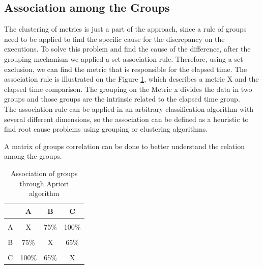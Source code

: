 \subsection{Association among the Groups}
\label{sec:association}
The clustering of metrics is just a part of the approach, since a rule of groups need to be applied to find the specific cause for the discrepancy on the executions. To solve this problem and find the cause of the difference, after the grouping mechanism we applied a set association rule. Therefore, using a set exclusion, we can find the metric that is responsible for the elapsed time.
The association rule is illustrated on the Figure \ref{fig:association}, which describes a metric X and the elapsed time comparison. The grouping on the Metric x divides the data in two groups and those groups are the intrinsic related to the elapsed time group. \\
The association rule can be applied in an arbitrary classification algorithm with several different dimensions, so the association can be defined as a heuristic to find root cause problems using grouping or clustering algorithms.

A matrix of groups correlation can be done to better understand the relation among the groups.


    
\begin{table}[h]
\centering
\begin{tabular}{cccc}
                      & A                         & B                        & C     \\ \hline
                      &                           &                          &       \\ 
A                     & X                         & 75\%                     & 100\% \\ \hline
                      &                           &                          &       \\ 
B                     & 75\%                      & X                        & 65\%  \\ \hline
                      &                           &                          &       \\
\multicolumn{1}{l}{C} & \multicolumn{1}{l}{100\%} & \multicolumn{1}{l}{65\%} & X     \\ \hline
\end{tabular}
\vspace{10pt}
\caption{Association of groups through Apriori algorithm}
\label{fig:association}
\end{table}

